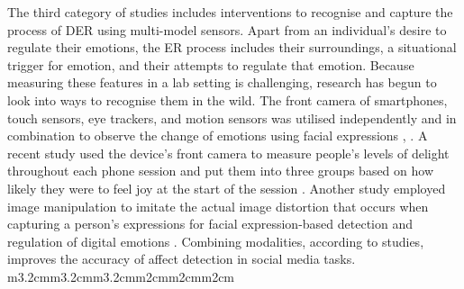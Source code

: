 \documentclass[acmtog]{acmart}
\begin{document}
The third category of studies includes interventions to recognise and capture the process of DER using multi-model sensors. Apart from an individual's desire to regulate their emotions, the ER process includes their surroundings, a situational trigger for emotion, and their attempts to regulate that emotion. Because measuring these features in a lab setting is challenging, research has begun to look into ways to recognise them in the wild. The front camera of smartphones, touch sensors, eye trackers, and motion sensors was utilised independently and in combination to observe the change of emotions using facial expressions \cite{yang2021behavioral}, \cite{ruensuk2020you}. A recent study used the device's front camera to measure people's levels of delight throughout each phone session and put them into three groups based on how likely they were to feel joy at the start of the session \cite{tag2022emotion}. Another study employed image manipulation to imitate the actual image distortion that occurs when capturing a person's expressions for facial expression-based detection and regulation of digital emotions \cite{yang2021benchmarking}. Combining modalities, according to studies, improves the accuracy of affect detection in social media tasks.
m{3.2cm}m{3.2cm}m{3.2cm}m{2cm}m{2cm}m{2cm}
\end{document}
